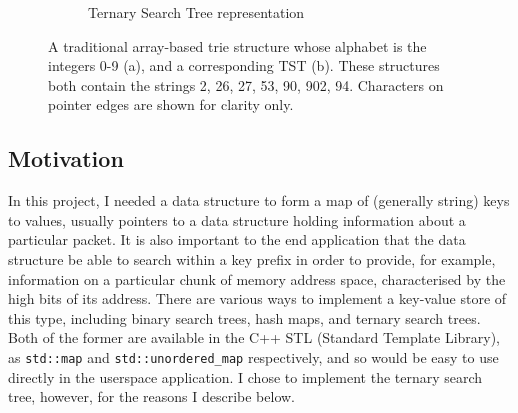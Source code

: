 \documentclass[a4paper,12pt,twoside,openright]{report}
\begin{document}
\begin{figure}
\begin{subfigure}{\linewidth}
			\caption{Ternary Search Tree representation}
		\end{subfigure}
		\caption{A traditional array-based trie structure whose alphabet is the integers 0-9 (a), and a corresponding TST (b). These structures both contain the strings 2, 26, 27, 53, 90, 902, 94. Characters on pointer edges are shown for clarity only.}
		\label{fig:trie-tst}
	\end{figure}
	
	\subsection{Motivation}
	
	In this project, I needed a data structure to form a map of (generally string) keys to values, usually pointers to a data structure holding information about a particular packet. It is also important to the end application that the data structure be able to search within a key prefix in order to provide, for example, information on a particular chunk of memory address space, characterised by the high bits of its address. There are various ways to implement a key-value store of this type, including binary search trees, hash maps, and ternary search trees. Both of the former are available in the C++ STL (Standard Template Library), as \verb|std::map| and \verb|std::unordered_map| respectively, and so would be easy to use directly in the userspace application. I chose to implement the ternary search tree, however, for the reasons I describe below.
	
\end{document}
